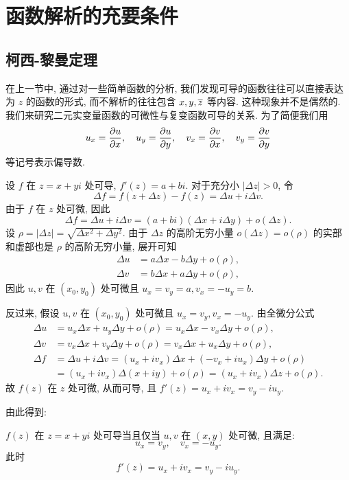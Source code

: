 \section{函数解析的充要条件}

\subsection{柯西-黎曼定理}

在上一节中, 通过对一些简单函数的分析, 我们发现可导的函数往往可以直接表达为 $z$ 的函数的形式, 而不解析的往往包含 $x,y,\overline z$ 等内容.
这种现象并不是偶然的.
我们来研究二元实变量函数的可微性与复变函数可导的关系.
为了简便我们用
\[
  u_x=\dfrac{\partial u}{\partial x},\quad
  u_y=\dfrac{\partial u}{\partial y},\quad
  v_x=\dfrac{\partial v}{\partial x},\quad
  v_y=\dfrac{\partial v}{\partial y}
\]
等记号表示偏导数.

设 $f$ 在 $z=x+yi$ 处可导, $f'(z)=a+bi$.
对于充分小 $|\Delta z|>0$, 令
\[
   \Delta f
  =f(z+\Delta z)-f(z)
  =\Delta u+i\Delta v.
\]
由于 $f$ 在 $z$ 处可微, 因此
\[
   \Delta f
  =\Delta u+i\Delta v
  =(a+bi)(\Delta x+i\Delta y)+o(\Delta z).
\]
设 $\rho=|\Delta z|=\sqrt{\Delta x^2+\Delta y^2}$.
由于 $\Delta z$ 的高阶无穷小量 $o(\Delta z)=o(\rho)$ 的实部和虚部也是 $\rho$ 的高阶无穷小量, 展开可知
\begin{align*}
  \Delta u&=a\Delta x-b\Delta y+o(\rho),\\
  \Delta v&=b\Delta x+a\Delta y+o(\rho),
\end{align*}
因此 $u,v$ 在 $(x_0,y_0)$ 处可微且 $u_x=v_y=a,v_x=-u_y=b$.

反过来, 假设 $u,v$ 在 $(x_0,y_0)$ 处可微且 $u_x=v_y, v_x=-u_y$. 由全微分公式
\begin{align*}
  \Delta u&=u_x\Delta x+u_y\Delta y+o(\rho)
    =u_x\Delta x-v_x\Delta y+o(\rho),\\
  \Delta v&=v_x\Delta x+v_y\Delta y+o(\rho)
    =v_x\Delta x+u_x\Delta y+o(\rho),\\
  \Delta f&=\Delta u+i\Delta v
    =(u_x+i v_x)\Delta x+(-v_x+i u_x)\Delta y+o(\rho)\\
   &=(u_x+i v_x)\Delta(x+iy)+o(\rho)
    =(u_x+i v_x)\Delta z+o(\rho).
\end{align*}
故 $f(z)$ 在 $z$ 处可微, 从而可导, 且 $f'(z)=u_x+i v_x=v_y-i u_y$.

由此得到:
\begin{theorem}[柯西-黎曼定理]
  $f(z)$ 在 $z=x+yi$ 处可导当且仅当 $u,v$ 在 $(x,y)$ 处可微, 且满足:
    \[u_x=v_y,\quad v_x=-u_y.\]
  此时
    \[f'(z)=u_x+iv_x=v_y-iu_y.\]
\end{theorem}

